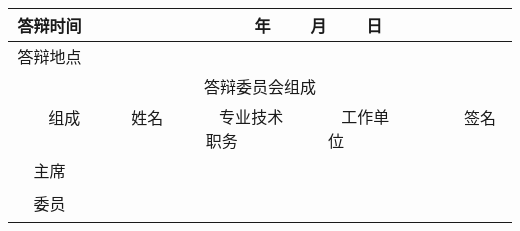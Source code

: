 \begin{titlepage}

\par \vskip10pt
\par \vskip50pt


\begin{table}[htbp]
\centering
\renewcommand\arraystretch{1.8}
\begin{tabular}{|c|c|c|c|c|}
\hline
答辩时间 & \multicolumn{4}{c|}{ ~~~ 年 ~~~ 月 ~~~ 日} \\ \hline
答辩地点 & \multicolumn{4}{c|}{}\\ \hline
\multicolumn{5}{|c|}{答辩委员会组成}\\ \hline
~~~ 组成 ~~~ & ~~~ 姓名 ~~~ & ~~~ 专业技术职务 ~~~ & ~~~ 工作单位 ~~~ & ~~~~~ 签名 ~~~~~ \\ \hline
主席 & & & & \\ \hline
\multirow{6}{*}{委员} & & & & \\ \cline{2-5}
 & & & & \\ \cline{2-5}
 & & & & \\ \cline{2-5}
 & & & & \\ \cline{2-5}
 & & & & \\ \cline{2-5}
 & & & & \\ \hline
\end{tabular}
\end{table}

    
\end{titlepage}
